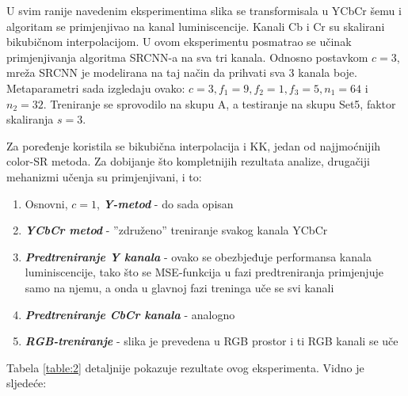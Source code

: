 \documentclass[12pt]{report}
\numberwithin{equation}{section}
\begin{document}
  U svim ranije navedenim eksperimentima slika se transformisala u YCbCr šemu i algoritam se primjenjivao na kanal luminiscencije. Kanali Cb i Cr su skalirani bikubičnom interpolacijom. U ovom eksperimentu posmatrao se učinak primjenjivanja algoritma SRCNN-a na sva tri kanala. Odnosno postavkom $c=3$, mreža SRCNN je modelirana na taj način da prihvati sva 3 kanala boje. Metaparametri sada izgledaju ovako: $c = 3, f_1 = 9, f_2 = 1, f_3 = 5, n_1 = 64$ i $n_2 = 32$. Treniranje se sprovodilo na skupu A, a testiranje na skupu Set5, faktor skaliranja $s=3$. 
   
  Za poređenje koristila se bikubična interpolacija i KK, jedan od najjmoćnijih color-SR metoda. Za dobijanje što kompletnijih rezultata analize, drugačiji mehanizmi učenja su primjenjivani, i to:
  
  \begin{enumerate}
  
   \item Osnovni, $c=1$, \textit{\textbf{Y-metod}} - do sada opisan
   \item \textit{\textbf{YCbCr metod}} - ''združeno'' treniranje svakog kanala YCbCr
   \item \textit{\textbf{Predtreniranje Y kanala}} - ovako se obezbjeđuje performansa kanala luminiscencije, tako što se MSE-funkcija u fazi predtreniranja primjenjuje samo na njemu, a onda u glavnoj fazi treninga uče se svi kanali  
   \item \textit{\textbf{Predtreniranje CbCr kanala}} - analogno
   \item \textbf{\textit{RGB-treniranje}} - slika je prevedena u RGB prostor i ti RGB kanali se uče
   
  \end{enumerate}
     
  
\newpage
 Tabela \ref{table:2} detaljnije pokazuje rezultate ovog eksperimenta. Vidno je sljedeće:
  
\end{document}
